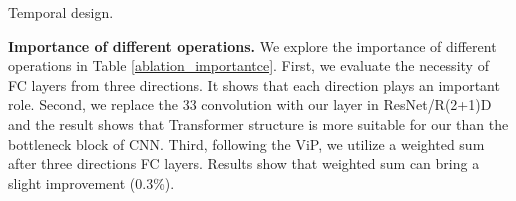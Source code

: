 \documentclass[runningheads]{llncs}
\begin{document}
\begin{table}[t]
    \begin{minipage}[t]{0.49\linewidth}
    \caption{Temporal design.}
        
        \centering
        \setlength{\tabcolsep}{1pt}
    \label{ablation_temporal}
    \end{minipage}
\begin{minipage}[t]{0.48\linewidth}
    \caption{Training cost.}
       
        \centering
        \setlength{\tabcolsep}{1.5pt}
    \label{throughput}
    \end{minipage}
    
  
\end{table}


%
 \noindent
\textbf{Importance of different operations.}
We explore the importance of different operations in Table \ref{ablation_importantce}. First, we evaluate the necessity of FC layers from three directions.
It shows that each direction plays an important role. 
Second, we replace the 33 convolution with our  layer in ResNet\cite{resnet}/R(2+1)D\cite{r(2+1)d} and the result shows that Transformer structure is more suitable for our  than the bottleneck block of CNN.  Third, following the ViP\cite{vip}, we utilize a weighted sum after three directions FC layers. Results show that weighted sum can bring a slight improvement (0.3\%).
\end{document}
